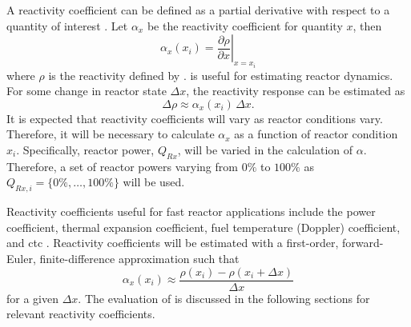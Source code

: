   A reactivity coefficient can be defined as a partial derivative with respect
  to a quantity of interest \cite{textbookknief}. Let $\alpha_x$ be the 
  reactivity coefficient for quantity $x$, then
  \begin{equation}
    \label{eq:reactivity_coefficient}
    \alpha_x(x_i) = \left. \frac{\partial \rho}{\partial x} \right|_{x=x_i}
  \end{equation}
  where $\rho$ is the reactivity defined by .
   is useful for estimating reactor dynamics.
  For some change in reactor state $\Delta x$, the reactivity response can be
  estimated as 
  \begin{equation}
    \label{eq:reactivity_estimate}
    \Delta \rho \approx \alpha_x(x_i) \, \Delta x.
  \end{equation}
  It is expected that reactivity coefficients will vary as reactor conditions
  vary. Therefore, it will be necessary to calculate $\alpha_x$ as a function of
  reactor condition $x_i$. Specifically, reactor power, $Q_{Rx}$, will be varied 
  in the calculation of $\alpha$. Therefore, a set of reactor powers varying 
  from $0\%$ to $100\%$ as $Q_{Rx,i} = \{0\%,\ldots,100\%\}$ will be used.

  Reactivity coefficients useful for fast reactor applications include the power
  coefficient, thermal expansion coefficient, fuel temperature (Doppler)
  coefficient, and \gls{ctc} \cite{textbookknief}.  Reactivity coefficients will
  be estimated with a first-order, forward-Euler, finite-difference
  approximation such that
  \begin{equation}
    \label{eq:reactivity_coefficient_finite_difference}
    \alpha_x(x_i) \approx \frac{\rho(x_i) - \rho(x_i + \Delta x)}{\Delta x}
  \end{equation}
  for a given $\Delta x$. The evaluation of
   is discussed in the
  following sections for relevant reactivity coefficients.

